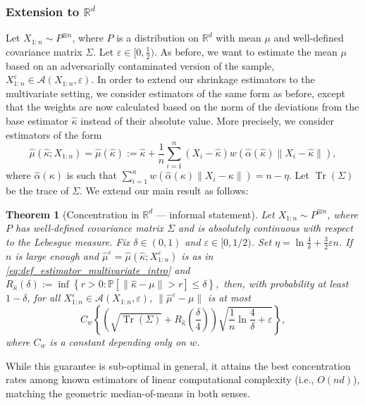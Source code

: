 \documentclass{article}
\theoremstyle{plain}
\newtheorem{theorem}{Theorem}[section]
\theoremstyle{definition}
\def\R{\mathbb{R}} %
\def\eps{\varepsilon}
\DeclareMathOperator{\tr}{Tr}
\renewcommand{\Pr}{\mathbb{P}}
\def\sA{\mathcal{A}}
\begin{document}
\subsubsection{Extension to $\R^d$}\label{sec:intro_multivariate}

Let \( X_{1:n} \sim P^{\otimes n}\), where \( P \) is a distribution on \( \R^d \) with mean \( \mu  \) and well-defined covariance matrix \( \Sigma  \). Let \( \eps \in [0,\frac{1}{2}) \). As before, we want to estimate the mean \( \mu  \) based on an adversarially contaminated version of the sample, \( X_{1:n}^\varepsilon  \in \sA(X_{1:n},\varepsilon ) \). In order to extend our shrinkage estimators to the multivariate setting, we consider estimators of the same form as before, except that the weights are now calculated based on the norm of the deviations from the base estimator \( \widehat{\kappa }  \) instead of their absolute value. More precisely, we consider estimators of the form
\begin{equation}
  \widehat{\mu }(\widehat{\kappa };X_{1:n} )=\widehat{\mu }(\widehat{\kappa } ):= \widehat{\kappa }+ \frac{1}{n}\sum_{i=1}^n (X_i -\widehat{\kappa } )w(\widehat{\alpha }(\widehat{\kappa } ) \lVert X_i -\widehat{\kappa }  \rVert  ),\label{eq:def_estimator_multivariate_intro}
\end{equation}
where \( \widehat{\alpha}(\kappa )   \) is such that \( \sum_{i=1}^n w(\widehat{\alpha }(\kappa ) \lVert X_i - \kappa \rVert ) = n -\eta  \). 
Let $\tr(\Sigma)$ be the trace of \( \Sigma \). We extend our main result as follows:
\begin{theorem}[Concentration in \( \R^d \) --- informal statement]\label{thm:multivariate_concentration_adv_informal}
  Let $X_{1:n}\sim P^{\otimes n}$, where \( P \) has well-defined covariance matrix \( \Sigma\)  and is absolutely continuous with respect to the Lebesgue measure. Fix \( \delta \in (0,1) \) and \( \varepsilon \in [0,1/2) \). Set $\eta = \ln\frac{4}{\delta}+\frac{3}{2} \eps n $. If \( n \) is large enough and  $\widehat{\mu}^\eps  =  \widehat{\mu}(\widehat{\kappa };X_{1:n}^\eps) $ is as in \eqref{eq:def_estimator_multivariate_intro} and $R_{\widehat{\kappa }}(\delta) := \inf\left\{r>0 : \Pr\left[\lVert\widehat{\kappa }- \mu\rVert > r\right] \leq \delta \right\},$ then, with probability at least $1-\delta $, for all \( X_{1:n}^\varepsilon \in \sA(X_{1:n},\varepsilon ) \), \( \lVert \widehat{\mu }^\varepsilon -\mu   \rVert  \) is at most  
  \begin{equation}
    C_{w}\left\{ \left(\sqrt{\tr(\Sigma)}+ R_{\widehat{\kappa } }\left(\frac{\delta}{4}\right)\right) \sqrt{\frac{1}{n}\ln \frac{4}{\delta } + \varepsilon }  \right\},\label{eq:conclusion_concentration_multivariate_informal}
  \end{equation}
where \( C_{w } \) is a constant depending only on \( w \).
\end{theorem}
While this guarantee is sub-optimal in general, it attains the best concentration rates among known estimators of linear computational complexity (i.e., \( O(nd) \)), matching the geometric median-of-means \cite{minsker2015geometric} in both senses.
\end{document}
